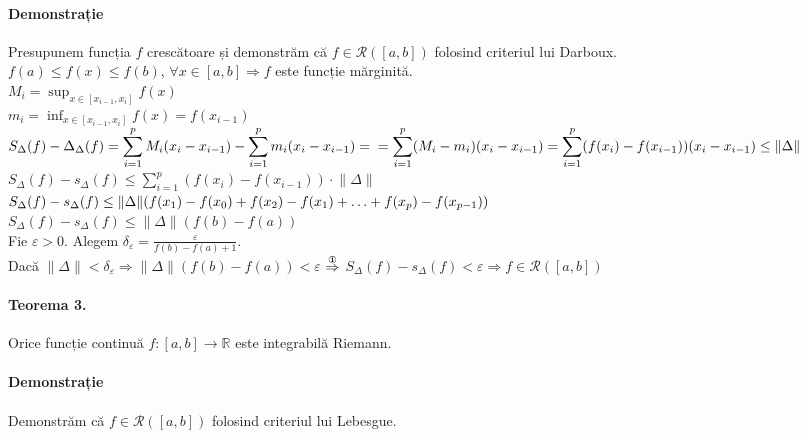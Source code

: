 \paragraph{Demonstrație}
Presupunem funcția $f$ crescătoare și demonstrăm că $f \in \mathcal{R}([a,b])$ folosind criteriul lui Darboux. \\[5pt]
$f(a) \leq f(x) \leq f(b)$, $\forall x \in [a,b] \Rightarrow f$ este funcție mărginită. \\[8pt]
$M_{i} = \displaystyle\sup_{x \in [x_{i-1}, x_{i}]} f(x)$ \\
$m_{i} = \displaystyle\inf_{x \in [x_{i-1}, x_{i}]} f(x) = f(x_{i-1})$\\ [5pt]
$S_{\Delta}(f) - \Delta_{\Delta}(f) = \displaystyle\sum_{i=1}^{p} M_{i}(x_{i} - x_{i-1}) - \displaystyle\sum_{i=1}^{p} m_{i}(x_{i} - x_{i-1}) = \\
= \displaystyle\sum_{i=1}^{p}(M_{i} - m_{i})(x_{i} - x_{i-1}) = \displaystyle\sum_{i=1}^{p}(f(x_{i}) - f(x_{i-1}))(x_{i}-x_{i-1}) \leq \lVert \Delta \rVert$ \\
$S_{\Delta}(f) - s_{\Delta}(f) \leq \displaystyle\sum_{i=1}^{p}(f(x_{i}) - f(x_{i-1})) \cdot \lVert \Delta \rVert$ \\
$S_{\Delta}(f) - s_{\Delta}(f) \leq \lVert \Delta \rVert (f(x_{1}) - f(x_{0}) + f(x_{2}) - f(x_{1}) + \mathellipsis + f(x_{p}) - f(x_{p-1}))$ \\[5pt]
$S_{\Delta}(f) - s_{\Delta}(f) \leq \lVert \Delta \rVert (f(b) - f(a))$  \\[8pt]
Fie $\varepsilon > 0$. Alegem $\delta_{\varepsilon} = \displaystyle\frac{\varepsilon}{f(b) - f(a) + 1}$. \\
Dacă $\lVert \Delta \rVert < \delta_{\varepsilon} \Rightarrow \lVert \Delta \rVert (f(b) - f(a)) < \varepsilon$ $\overset{\text{\ding{172}}}{\Rightarrow}$
$S_{\Delta}(f) - s_{\Delta}(f) < \varepsilon \Rightarrow f \in \mathcal{R}([a,b])$ \\

\paragraph{Teorema 3.}
Orice funcție continuă $f:[a,b] \rightarrow \mathbb{R}$ este integrabilă Riemann.

\paragraph{Demonstrație}
Demonstrăm că $f \in \mathcal{R}([a,b])$ folosind criteriul lui Lebesgue. \\[9pt]

